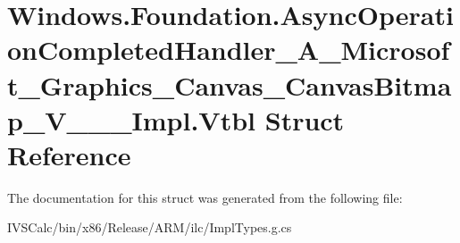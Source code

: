 \hypertarget{struct_windows_1_1_foundation_1_1_async_operation_completed_handler___a___microsoft___graphics__faca42185681796ea73a840ce18dac1e}{}\section{Windows.\+Foundation.\+Async\+Operation\+Completed\+Handler\+\_\+\+A\+\_\+\+Microsoft\+\_\+\+Graphics\+\_\+\+Canvas\+\_\+\+Canvas\+Bitmap\+\_\+\+V\+\_\+\+\_\+\+\_\+\+Impl.\+Vtbl Struct Reference}
\label{struct_windows_1_1_foundation_1_1_async_operation_completed_handler___a___microsoft___graphics__faca42185681796ea73a840ce18dac1e}


The documentation for this struct was generated from the following file\+:\begin{DoxyCompactItemize}
\item 
I\+V\+S\+Calc/bin/x86/\+Release/\+A\+R\+M/ilc/Impl\+Types.\+g.\+cs\end{DoxyCompactItemize}
